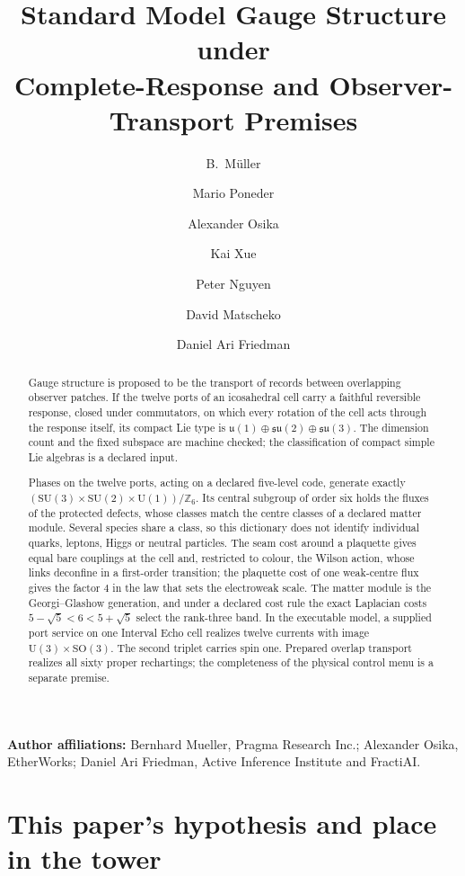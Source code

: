 \documentclass[11pt]{article}
\title{Standard Model Gauge Structure under\\
Complete-Response and Observer-Transport Premises}
\author{B.\ M\"uller \and Mario Poneder \and Alexander Osika \and Kai Xue
\and Peter Nguyen \and David Matscheko \and Daniel Ari Friedman}
\date{\OPHPaperReleaseDate}
\begin{document}
\maketitle
\OPHPaperReleaseBanner

\begin{center}
\small\textbf{Author affiliations:} Bernhard Mueller, Pragma Research Inc.; Alexander Osika, EtherWorks; Daniel Ari Friedman, Active Inference Institute and FractiAI.
\end{center}

\begin{abstract}
Gauge structure is proposed to be the transport of records between
overlapping observer patches. If the twelve ports of an icosahedral cell
carry a faithful reversible response, closed under commutators, on which
every rotation of the cell acts through the response itself, its compact
Lie type is \(\mathfrak u(1)\oplus\mathfrak{su}(2)\oplus\mathfrak{su}(3)\).
The dimension count and the fixed subspace are machine checked; the
classification of compact simple Lie algebras is a declared input.

Phases on the twelve ports, acting on a declared five-level code, generate
exactly \((\mathrm{SU}(3)\times\mathrm{SU}(2)\times\mathrm U(1))/\mathbb Z_6\).
Its central subgroup of order six holds the fluxes of the protected defects,
whose classes match the centre classes of a declared matter module. Several
species share a class, so this dictionary does not identify individual
quarks, leptons, Higgs or neutral particles. The seam cost around a
plaquette gives equal bare couplings at the cell and, restricted to colour,
the Wilson action, whose links deconfine in a first-order transition; the
plaquette cost of one weak-centre flux gives the factor \(4\) in the law
that sets the electroweak scale. The matter module is the Georgi--Glashow
generation, and under a declared cost rule the exact Laplacian costs
\(5-\sqrt5<6<5+\sqrt5\) select the rank-three band. In the executable model,
a supplied port service on one Interval Echo cell realizes twelve currents
with image \(\mathrm U(3)\times\mathrm{SO}(3)\). The second triplet carries
spin one. Prepared overlap transport realizes all sixty proper rechartings; the
completeness of the physical control menu is a separate premise.
\end{abstract}



\section*{This paper's hypothesis and place in the tower}
\label{sec:gauge-hypothesis}
\end{document}
